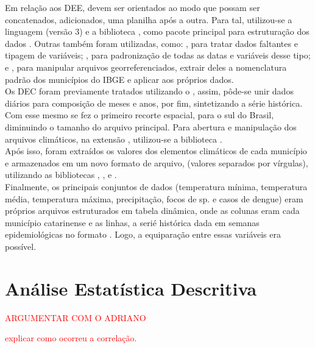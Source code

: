 Em relação aos \acrshort{DEE}, devem ser orientados ao modo que possam ser concatenados, adicionados, uma planilha após a outra. Para tal, utilizou-se a linguagem  (versão 3) \cite{python3_2009_van}  e a biblioteca  \cite{pandas_2010_scipy, pandas_2020_reback}, como pacote principal para estruturação dos dados . Outras também foram utilizadas, como:  \cite{numpy_2020_harrisarray}, para tratar dados faltantes e tipagem de variáveis;  \cite{python2_1995_van}, para padronização de todas as datas e variáveis desse tipo; e  \cite{geopandas_2020_kelseyjordahl}, para manipular arquivos georreferenciados, extrair deles a nomenclatura padrão dos municípios do \acrshort{IBGE} e aplicar aos próprios dados.\\
\indent Os \acrshort{DEC} foram previamente tratados utilizando o  \cite{CDO_2023_schulzweida}, assim, pôde-se unir dados diários para composição de meses e anos, por fim, sintetizando a série histórica. Com esse mesmo  se fez o primeiro recorte espacial, para o sul do Brasil, diminuindo o tamanho do arquivo principal. Para abertura e manipulação dos arquivos climáticos, na extensão , utilizou-se a biblioteca  \cite{xarray_2016_v0_8_0, xarray_2017_hoyer}.\\
\indent Após isso, foram extraídos os valores dos elementos climáticos de cada município e armazenados em um novo formato de arquivo,  (valores separados por vírgulas), utilizando as bibliotecas , ,  e  \cite{shapely_2007_gillies}.\\
\indent Finalmente,  os principais conjuntos de dados (temperatura mínima, temperatura média, temperatura máxima, precipitação, focos de  sp. e casos de dengue) eram próprios arquivos estruturados em tabela dinâmica, onde as colunas eram cada município catarinense e as linhas, a serié histórica dada em semanas epidemiológicas no formato . Logo, a equiparação entre essas variáveis era possível.


\section{Análise Estatística Descritiva}

\indent \textcolor{red}{ARGUMENTAR COM O ADRIANO}

\indent \textcolor{red}{explicar como ocorreu a correlação.}

